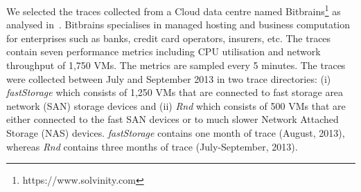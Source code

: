 We selected the traces collected from a Cloud data centre named Bitbrains\footnote{https://www.solvinity.com} as analysed in~\cite{workloadCCGRID:2015}. %
Bitbrains specialises in managed hosting and business computation for enterprises such as banks, credit card operators, insurers, etc. 
The traces contain seven performance metrics including CPU utilisation and network throughput of 1,750 VMs. The metrics are sampled every 5 minutes. The traces were collected between July and September 2013 in two trace directories: (i) \textit{fastStorage} which consists of 1,250 VMs that are connected to fast storage area network (SAN) storage devices and (ii) \textit{Rnd} which consists of 500 VMs that are either connected to the fast SAN devices or to much slower Network Attached Storage (NAS) devices. \textit{fastStorage} contains one month of trace (August, 2013), whereas \textit{Rnd} contains three months of trace (July-September, 2013).
